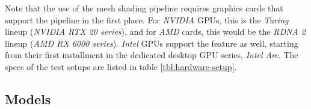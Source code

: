 \noindent
Note that the use of the mesh shading pipeline requires graphics cards that support the pipeline in the first place. 
For \emph{NVIDIA} \ac{GPU}s, this is the \emph{Turing} lineup (\emph{NVIDIA RTX 20 series}), and for \emph{AMD} cards, 
this would be the \emph{RDNA 2} lineup (\emph{AMD RX 6000 series}). \emph{Intel} \ac{GPU}s support the feature as 
well, starting from their first installment in the dedicated desktop \ac{GPU} series, \emph{Intel Arc}. The specs of 
the test setups are listed in table \ref{tbl:hardware-setup}. \\


\subsection*{Models} \label{subsec-models}

